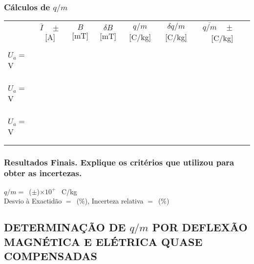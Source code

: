 \documentclass[a4paper,12pt]{article}  %
\begin{document}
\subsubsection{\sf Cálculos de $q/m$}
\label{sec:calc}
\begin{center}
	\begin{tabular}{l|c|c|c|c|c|c|}
	\cline{2-7}
	 & $\overline{I}\quad \pm$ [A] &  $B$ [mT] & $\delta B$  [mT] & $q/m$ [C/kg] & $\delta q/m$ [C/kg] & $\overline{q/m}\quad \pm \quad $ [C/kg]\\ \cline{2-7}
	 &&&&&&   \\ \cline{2-6}
	 &&&&&& \\ \cline{2-6}
	 $U_a=$ \underline{\makebox[1.2cm][r]{~}} V   &&&&&&  \\ \cline{2-6}
	 &&&&&& \\ \cline{2-6}
	 &&&&&& \\ \hline \hline
	  
	 &&&&&& \\ \cline{2-6}
	 &&&&&& \\ \cline{2-6}
	$U_a=$ \underline{\makebox[1.2cm][r]{~}} V  &&&&&& \\
	\cline{2-6}
	 &&&&&& \\ \cline{2-6}
	 &&&&&& \\
	 \hline \hline
	 &&&&&& \\ \cline{2-6}
	 &&&&&& \\ \cline{2-6}
	 $U_a=$ \underline{\makebox[1.2cm][r]{~}} V  &&&&&& \\ \cline{2-6}
	 &&&&&& \\ \cline{2-6}
	 &&&&&& \\
	 \cline{2-7} 
 	\end{tabular}
\end{center}


\subsubsection{\sf Resultados Finais. Explique os critérios que utilizou para obter as incertezas.}
\noindent  $q/m =$~(\underline{\makebox[1.5cm][r]{~}}$\pm$\underline{\makebox[1cm][r]{~}})$\times 10^{+}\,\,\,$  C/kg  \\  

\noindent  Desvio à Exactidão $=$~\underline{\makebox[1cm][r]{~}}(\%), 
Incerteza relativa $=$~\underline{\makebox[1cm][r]{~}}($\%$) 

\newpage

\subsection{\sf DETERMINAÇÃO DE $q/m$ POR DEFLEXÃO\\ MAGNÉTICA E ELÉTRICA QUASE COMPENSADAS }
\end{document}
